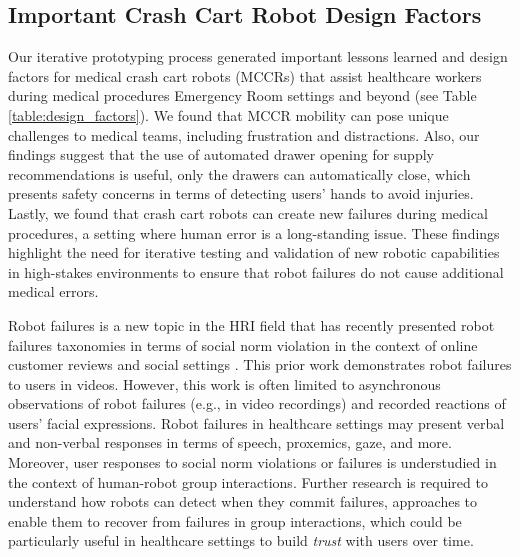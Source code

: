 \subsection{Important Crash Cart Robot Design Factors}

Our iterative prototyping process generated important lessons learned and design factors for medical crash cart robots (MCCRs) that assist healthcare workers during medical procedures Emergency Room settings and beyond (see Table \ref{table:design_factors}). 
We found that MCCR mobility can pose unique challenges to medical teams, including frustration and distractions. 
Also, our findings suggest that the use of automated drawer opening for supply recommendations is useful, only the drawers can automatically close, which presents safety concerns in terms of detecting users' hands to avoid injuries.
  Lastly, we found that crash cart robots can create new failures during medical procedures, a setting where human error is a long-standing issue. 
These findings highlight the need for iterative testing and validation of new robotic capabilities in high-stakes environments to ensure that robot failures do not cause additional medical errors.

Robot failures is a new topic in the HRI field that has recently presented robot failures taxonomies in terms of social norm violation in the context of online customer reviews \cite{honig2022taxonomy} and social settings \cite{bremers2023bystander,bremers2023facial}. 
This prior work demonstrates robot failures to users in videos. %
However, this work is often limited to asynchronous observations of robot failures (e.g., in video recordings) and recorded reactions of users' facial expressions. 
Robot failures in healthcare settings may present verbal and non-verbal responses in terms of speech, proxemics, gaze, and more. 
Moreover, user responses to social norm violations or failures is understudied in the context of human-robot group interactions. 
Further research is required to understand how robots can detect when they commit failures, approaches to enable them to recover from failures in group interactions, which could be particularly useful in healthcare settings to build \textit{trust} with users over time.

